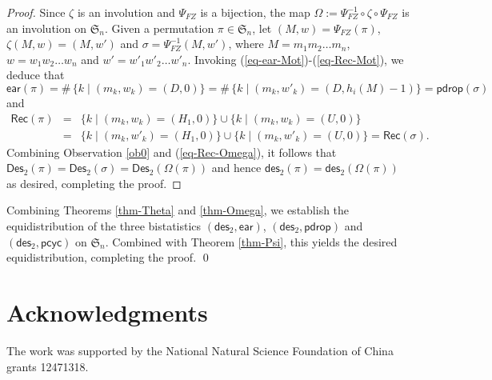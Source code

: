 \documentclass[12pt]{article}
\numberwithin{equation}{section}
\theoremstyle{plain}
\def\Rec{\mathsf{Rec}}
\def\des{\mathsf{des}}
\def\ear{\mathsf{ear}}
\def\pcyc{\mathsf{pcyc}}
\def\pdrop{\mathsf{pdrop}}
\def\Des{\mathsf{Des}}
\begin{document}
    	 	\begin{proof}
    	 		Since   $\zeta$ is an involution and $\Psi_{FZ}$ is a bijection,  the map $\Omega:= \Psi^{-1}_{FZ}\circ\zeta\circ \Psi_{FZ}$ is  an involution on $\mathfrak{S}_n$.  Given a permutation $\pi\in \mathfrak{S}_n$, let $(M,w)=\Psi_{FZ}(\pi)$, $\zeta(M,w)=(M,w')$ and  $\sigma=\Psi^{-1}_{FZ}(M,w')$, where $M=m_1m_2\ldots m_n$, $w=w_1w_2\ldots w_n$  and $w'=w'_1w'_2\ldots w'_n$. 
    	 		Invoking (\ref{eq-ear-Mot})-(\ref{eq-Rec-Mot}),  we deduce that
    	 		$$
    	 		\ear(\pi)=\#\, \{k\mid (m_k, w_k)=(D, 0)\}= \#\, \{k\mid (m_k, w'_k)=(D, h_i(M)-1)\}=\pdrop(\sigma)
    	 		$$
    	 		and 
    	 		\begin{equation}\label{eq-Rec-Omega}
    	 			\begin{array}{lll}
    	 			\Rec(\pi)&=&\{k\mid (m_k, w_k)=(H_1, 0)\}\cup\{k\mid (m_k, w_k)=(U, 0)\}\\
    	 			&=&\{k\mid (m_k, w'_k)=(H_1, 0)\} \cup\{k\mid (m_k, w'_k)=(U, 0)\}=\Rec(\sigma).
    	 			\end{array}
    	 		\end{equation}
    	 		Combining Observation \ref{ob0} and (\ref{eq-Rec-Omega}), it follows that
    	 		$\Des_2(\pi)=\Des_2(\sigma)=\Des_2(\Omega(\pi))$ and hence $\des_2(\pi)=\des_2(\Omega(\pi))$ as desired, completing the proof.
    	 		\end{proof}
    	 		
    	 	
    	 		Combining Theorems \ref{thm-Theta} and \ref{thm-Omega}, we establish the equidistribution of the three bistatistics
    	 		$(\des_2, \ear)$, $(\des_2, \pdrop)$ and $(\des_2, \pcyc)$ on $\mathfrak{S}_n$. Combined with Theorem \ref{thm-Psi}, this yields the desired equidistribution, completing the proof. \qed
    	 		
    	 	 
   \section*{Acknowledgments}  
   The work  was supported by
   the National Natural
   Science Foundation of China grants 12471318.
  
  
  
  
 
	
	
\end{document}
